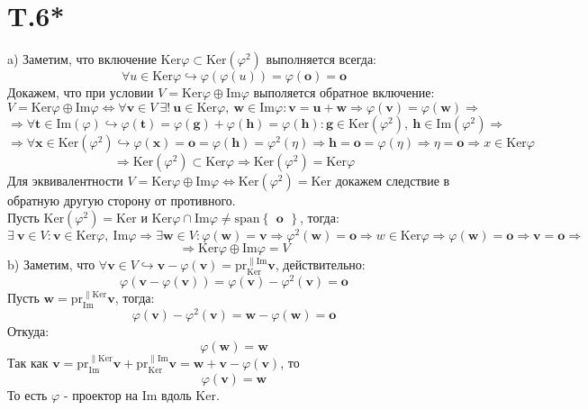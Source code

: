 \documentclass[a4paper,12pt]{article} %
\begin{document}
\section*{T.6*}
a) Заметим, что включение $\mathrm{Ker}\varphi\subset\mathrm{Ker}(\varphi^2)$ выполняется всегда:
$$\forall u\in\mathrm{Ker}\varphi\hookrightarrow\varphi(\varphi(u))=\varphi(\textbf{o})=\textbf{o}$$
Докажем, что при условии $V=\mathrm{Ker}\varphi\oplus\mathrm{Im}\varphi$ выполяется обратное включение:
$$V=\mathrm{Ker}\varphi\oplus\mathrm{Im}\varphi\Leftrightarrow\forall \textbf{v}\in V\ \exists !\ \textbf{u}\in\mathrm{Ker}\varphi,\  \textbf{w}\in\mathrm{Im}\varphi:\textbf{v}=\textbf{u}+\textbf{w}\Rightarrow \varphi(\textbf{v})=\varphi(\textbf{w})\Rightarrow $$
$$\Rightarrow\forall \textbf{t}\in\mathrm{Im}(\varphi)\hookrightarrow\varphi(\textbf{t})=\varphi(\textbf{g})+\varphi(\textbf{h})=\varphi(\textbf{h}):\textbf{g}\in\mathrm{Ker}(\varphi^2),\ \textbf{h}\in\mathrm{Im}(\varphi^2)\Rightarrow$$
$$\Rightarrow\forall \textbf{x}\in\mathrm{Ker}(\varphi^2)\hookrightarrow\varphi(\textbf{x})=\textbf{o}=\varphi(\textbf{h})=\varphi^2(\eta)\Rightarrow \textbf{h}=\textbf{o}=\varphi(\eta)\Rightarrow\eta=\textbf{o}\Rightarrow x\in\mathrm{Ker}\varphi$$
$$\Rightarrow \mathrm{Ker}(\varphi^2)\subset\mathrm{Ker}\varphi\Rightarrow\mathrm{Ker}(\varphi^2)=\mathrm{Ker}\varphi$$
Для эквивалентности $V=\mathrm{Ker}\varphi\oplus\mathrm{Im}\varphi\Leftrightarrow\mathrm{Ker}(\varphi^2)=\mathrm{Ker}$ докажем следствие в обратную другую сторону от противного.\\
Пусть $\mathrm{Ker}(\varphi^2)=\mathrm{Ker}$ и $\mathrm{Ker}\varphi\cap\mathrm{Im}\varphi\neq\mathrm{span}\begin{Bmatrix}
\textbf{o}\end{Bmatrix}$, тогда:
$$\exists\ \textbf{v}\in V:\textbf{v}\in\mathrm{Ker}\varphi,\ \mathrm{Im}\varphi\Rightarrow\exists \textbf{w}\in V:\varphi(\textbf{w})=\textbf{v}\Rightarrow\varphi^2(\textbf{w})=\textbf{o}\Rightarrow w\in\mathrm{Ker}\varphi\Rightarrow\varphi(\textbf{w})=\textbf{o}\Rightarrow \textbf{v}=\textbf{o}\Rightarrow$$
$$\Rightarrow\mathrm{Ker}\varphi\oplus\mathrm{Im}\varphi=V$$
b) Заметим, что $\forall \textbf{v}\in V\hookrightarrow \textbf{v}-\varphi(\textbf{v})=\mathrm{pr}_{\mathrm{Ker}}^{\parallel \mathrm{Im}}\textbf{v}$, действительно:
$$\varphi(\textbf{v}-\varphi(\textbf{v}))=\varphi(\textbf{v})-\varphi^2(\textbf{v})=\textbf{o}$$
Пусть $\textbf{w}=\mathrm{pr}_{\mathrm{Im}}^{\parallel \mathrm{Ker}}\textbf{v}$, тогда:
$$\varphi(\textbf{v})-\varphi^2(\textbf{v})=\textbf{w}-\varphi(\textbf{w})=\textbf{o}$$
Откуда:
$$\varphi(\textbf{w})=\textbf{w}$$
Так как $\textbf{v}=\mathrm{pr}_{\mathrm{Im}}^{\parallel \mathrm{Ker}}\textbf{v}+\mathrm{pr}_{\mathrm{Ker}}^{\parallel \mathrm{Im}}\textbf{v}=\textbf{w}+\textbf{v}-\varphi(\textbf{v})$, то
$$\varphi(\textbf{v})=\textbf{w}$$
То есть $\varphi$ - проектор на $\mathrm{Im}$ вдоль $\mathrm{Ker}$.
\end{document}
